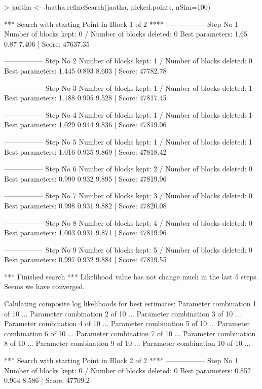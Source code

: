 
\begin{Schunk}
\begin{Sinput}
> jaatha <- Jaatha.refineSearch(jaatha, picked.points, nSim=100)
\end{Sinput}
\begin{Soutput}
*** Search with starting Point in Block 1 of 2 **** 
----------------- 
Step No 1 
Number of blocks kept: 0  / Number of blocks deleted: 0 
Best parameters:  1.65 0.87 7.406 | Score: 47637.35 

----------------- 
Step No 2 
Number of blocks kept: 1  / Number of blocks deleted: 0 
Best parameters:  1.445 0.893 8.603 | Score: 47782.78 

----------------- 
Step No 3 
Number of blocks kept: 1  / Number of blocks deleted: 1 
Best parameters:  1.188 0.905 9.528 | Score: 47817.45 

----------------- 
Step No 4 
Number of blocks kept: 1  / Number of blocks deleted: 1 
Best parameters:  1.029 0.944 9.836 | Score: 47819.06 

----------------- 
Step No 5 
Number of blocks kept: 1  / Number of blocks deleted: 1 
Best parameters:  1.016 0.935 9.869 | Score: 47818.42 

----------------- 
Step No 6 
Number of blocks kept: 2  / Number of blocks deleted: 0 
Best parameters:  0.999 0.932 9.895 | Score: 47819.96 

----------------- 
Step No 7 
Number of blocks kept: 3  / Number of blocks deleted: 0 
Best parameters:  0.998 0.931 9.882 | Score: 47820.08 

----------------- 
Step No 8 
Number of blocks kept: 4  / Number of blocks deleted: 0 
Best parameters:  1.003 0.931 9.871 | Score: 47819.96 

----------------- 
Step No 9 
Number of blocks kept: 5  / Number of blocks deleted: 0 
Best parameters:  0.997 0.932 9.884 | Score: 47819.55 

*** Finished search *** 
Likelihood value has not change much in the last 5 steps. 
Seems we have converged. 

Calulating composite log likelihoods for best estimates: 
Parameter combination 1 of 10 ... 
Parameter combination 2 of 10 ... 
Parameter combination 3 of 10 ... 
Parameter combination 4 of 10 ... 
Parameter combination 5 of 10 ... 
Parameter combination 6 of 10 ... 
Parameter combination 7 of 10 ... 
Parameter combination 8 of 10 ... 
Parameter combination 9 of 10 ... 
Parameter combination 10 of 10 ... 

*** Search with starting Point in Block 2 of 2 **** 
----------------- 
Step No 1 
Number of blocks kept: 0  / Number of blocks deleted: 0 
Best parameters:  0.852 0.964 8.586 | Score: 47709.2 


\end{Soutput}
\end{Schunk}
